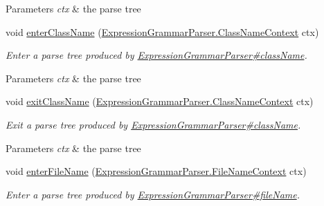 \begin{DoxyCompactItemize}
\begin{DoxyCompactList}
\begin{DoxyParams}{Parameters}
{\em ctx} & the parse tree\\
\hline
\end{DoxyParams}
 \end{DoxyCompactList}\item 
void \hyperlink{classgov_1_1nasa_1_1jpf_1_1inspector_1_1server_1_1expression_1_1parser_1_1_expression_grammar_base_listener_a397a401ae01bef424ce0a6c63609aaac}{enter\+Class\+Name} (\hyperlink{classgov_1_1nasa_1_1jpf_1_1inspector_1_1server_1_1expression_1_1parser_1_1_expression_grammar_parser_1_1_class_name_context}{Expression\+Grammar\+Parser.\+Class\+Name\+Context} ctx)
\begin{DoxyCompactList}\small\item\em Enter a parse tree produced by \hyperlink{classgov_1_1nasa_1_1jpf_1_1inspector_1_1server_1_1expression_1_1parser_1_1_expression_grammar_parser_aafe03b251eef204ae911768faa5fd862}{Expression\+Grammar\+Parser\#class\+Name}.


\begin{DoxyParams}{Parameters}
{\em ctx} & the parse tree\\
\hline
\end{DoxyParams}
 \end{DoxyCompactList}\item 
void \hyperlink{classgov_1_1nasa_1_1jpf_1_1inspector_1_1server_1_1expression_1_1parser_1_1_expression_grammar_base_listener_ac34a6871bd807f894ca638fa663a4d23}{exit\+Class\+Name} (\hyperlink{classgov_1_1nasa_1_1jpf_1_1inspector_1_1server_1_1expression_1_1parser_1_1_expression_grammar_parser_1_1_class_name_context}{Expression\+Grammar\+Parser.\+Class\+Name\+Context} ctx)
\begin{DoxyCompactList}\small\item\em Exit a parse tree produced by \hyperlink{classgov_1_1nasa_1_1jpf_1_1inspector_1_1server_1_1expression_1_1parser_1_1_expression_grammar_parser_aafe03b251eef204ae911768faa5fd862}{Expression\+Grammar\+Parser\#class\+Name}.


\begin{DoxyParams}{Parameters}
{\em ctx} & the parse tree\\
\hline
\end{DoxyParams}
 \end{DoxyCompactList}\item 
void \hyperlink{classgov_1_1nasa_1_1jpf_1_1inspector_1_1server_1_1expression_1_1parser_1_1_expression_grammar_base_listener_a3c34eff70e8bb45f3b3d74e0b4e12f2d}{enter\+File\+Name} (\hyperlink{classgov_1_1nasa_1_1jpf_1_1inspector_1_1server_1_1expression_1_1parser_1_1_expression_grammar_parser_1_1_file_name_context}{Expression\+Grammar\+Parser.\+File\+Name\+Context} ctx)
\begin{DoxyCompactList}\small\item\em Enter a parse tree produced by \hyperlink{classgov_1_1nasa_1_1jpf_1_1inspector_1_1server_1_1expression_1_1parser_1_1_expression_grammar_parser_adf54161babb1708d7e9f4bc2855c4ed0}{Expression\+Grammar\+Parser\#file\+Name}.



\end{DoxyCompactList}
\end{DoxyCompactItemize}
